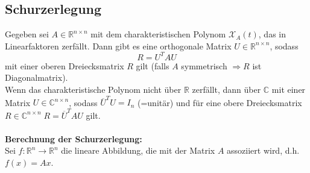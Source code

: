 \documentclass[a4paper,twocolumn,10pt]{article}
\begin{document}
\subsection{Schurzerlegung}
Gegeben sei $A\in\mathbb{R}^{n\times n}$ mit dem charakteristischen Polynom $\mathcal{X}_A(t)$, das in Linearfaktoren zerfällt. Dann gibt es eine orthogonale Matrix $U\in\mathbb{R}^{n\times n}$, sodass
\begin{equation*}
R=U^TAU
\end{equation*}
mit einer oberen Dreiecksmatrix $R$ gilt (falls $A$ symmetrisch $\Rightarrow R$ ist Diagonalmatrix).\\
Wenn das charakteristische Polynom nicht über $\mathbb{R}$ zerfällt, dann über $\mathbb{C}$ mit einer Matrix $U\in\mathbb{C}^{n\times n}$, sodass $\overline{U}^TU=I_n$ (=unitär) und für eine obere Dreiecksmatrix $R\in\mathbb{C}^{n\times n}\;R=\overline{U}^TAU$ gilt.\\\\
\textbf{Berechnung der Schurzerlegung:}\\
Sei $f:\mathbb{R}^n\rightarrow\mathbb{R}^n$ die lineare Abbildung, die mit der Matrix $A$ assoziiert wird, d.h. $f(x)=Ax$.
\end{document}
